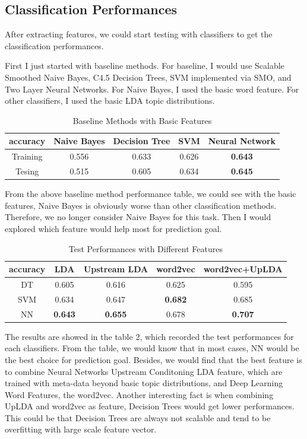 \subsection{Classification Performances}
After extracting features, we could start testing with classifiers to get the
classification performances.

First I just started with baseline methods. For baseline, I would use Scalable
Smoothed Naive Bayes, C4.5 Decision Trees, SVM implemented via SMO, and Two
Layer Neural Networks. For Naive Bayes, I used the basic word feature. For
other classifiers, I used the basic LDA topic distributions.


\begin{table}[h]
\renewcommand{\arraystretch}{1.5}
\centering
\begin{tabular}{|c|c|c|c|c|}
\hline
accuracy
& Naive Bayes
& Decision Tree
& SVM
& Neural Network \\
\hline
Training
& 0.556
& 0.633
& 0.626
& \textbf{0.643}\\
\hline
Tesing
& 0.515
& 0.605
& 0.634
& \textbf{0.645}\\
\hline
\end{tabular}
\caption{Baseline Methods with Basic Features}
\end{table}

From the above baseline method performance table, we could see with the basic
features, Naive Bayes is obviously worse than other classification methods.
Therefore, we no longer consider Naive Bayes for this task. Then I would
explored which feature would help most for prediction goal.

\begin{table}[h]
\renewcommand{\arraystretch}{1.5}
\centering
\begin{tabular}{|c|c|c|c|c|}
\hline
accuracy
& LDA
& Upstream LDA
& word2vec
& word2vec+UpLDA \\
\hline
DT
& 0.605
& 0.616
& 0.625
& 0.595\\
\hline
SVM
& 0.634
& 0.647
& \textbf{0.682}
& 0.685 \\
\hline
NN
& \textbf{0.643}
& \textbf{0.655}
& 0.678
& \textbf{0.707} \\
\hline
\end{tabular}
\caption{Test Performances with Different Features}
\end{table}

The results are showed in the table 2, which recorded the test performances for
each classifiers. From the table, we would know that in most cases, NN would be
the best choice for prediction goal. Besides, we would find that the best
feature is to combine Neural Networks Upstream Conditoning LDA feature, which are
trained with meta-data beyond basic topic distributions, and Deep Learning Word
Features, the word2vec. Another interesting fact is when combining UpLDA and
word2vec as feature, Decision Trees would get lower performances. This could be
that Decision Trees are always not scalable and tend to be overfitting with
large scale feature vector.

